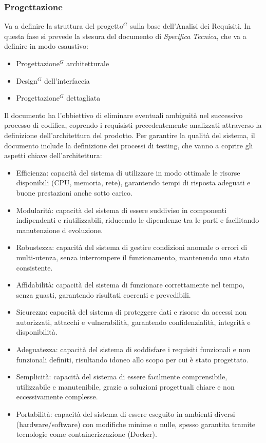 \documentclass[a4paper,10pt]{article}
\begin{document}
\subsubsection{Progettazione}
Va a definire la struttura del progetto$^G$ sulla base dell'Analisi dei Requisiti. In questa fase si prevede la stesura del documento di
\textit{Specifica Tecnica}, che va a definire in modo esaustivo:
\begin{itemize}
  \item Progettazione$^G$ architetturale
  \item Design$^G$ dell'interfaccia
  \item Progettazione$^G$ dettagliata 
\end{itemize}
Il documento ha l'obbiettivo di eliminare eventuali ambiguità nel successivo processo di codifica, coprendo i requisisti
precedentemente analizzati attraverso la definizione dell'architettura del prodotto.
Per garantire la qualità del sistema, il documento include la definizione dei processi di testing, che vanno a coprire gli aspetti
chiave dell'architettura:
\begin{itemize}
  \item Efficienza: capacità del sistema di utilizzare in modo ottimale le risorse disponibili (CPU, memoria, rete), garantendo tempi di risposta adeguati e buone prestazioni anche sotto carico.
  \item Modularità: capacità del sistema di essere suddiviso in componenti indipendenti e riutilizzabili, riducendo le dipendenze tra le parti e facilitando manutenzione d evoluzione.
  \item Robustezza: capacità del sistema di gestire condizioni anomale o errori di multi-utenza, senza interrompere il funzionamento, mantenendo uno stato consistente.
  \item Affidabilità: capacità del sistema di funzionare correttamente nel tempo, senza guasti, garantendo risultati coerenti e prevedibili.
  \item Sicurezza: capacità del sistema di proteggere dati e risorse da accessi non autorizzati, attacchi e vulnerabilità, garantendo confidenzialità, integrità e disponibilità.
  \item Adeguatezza: capacità del sistema di soddisfare i requisiti funzionali e non funzionali definiti, risultando idoneo allo scopo per cui è stato progettato.
  \item Semplicità: capacità del sistema di essere facilmente comprensibile, utilizzabile e manutenibile, grazie a soluzioni progettuali chiare e non eccessivamente complesse.
  \item Portabilità: capacità del sistema di essere eseguito in ambienti diversi (hardware/software) con modifiche minime o nulle, spesso garantita tramite tecnologie come containerizzazione (Docker).
\end{itemize}
\end{document}

